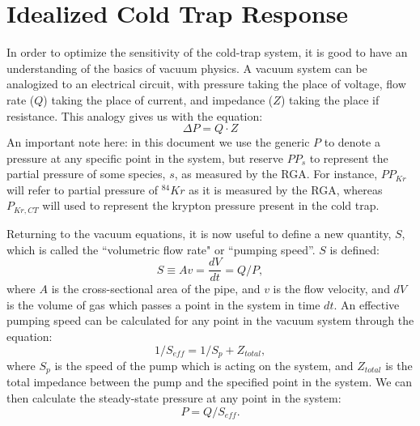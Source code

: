 \section{Idealized Cold Trap Response}
\label{sec:vaceq}
In order to optimize the sensitivity of the cold-trap system, it is good to have an understanding of the basics of vacuum physics. A vacuum system can be analogized to an electrical circuit, with pressure taking the place of voltage, flow rate ($Q$) taking the place of current, and impedance ($Z$) taking the place if resistance. This analogy gives us with the equation:
\begin{equation}
\label{eq:vaclaw1}
\Delta P = Q\cdot Z
\end{equation} 
An important note here: in this document we use the generic $P$ to denote a pressure at any specific point in the system, but reserve $PP_{s}$ to represent the partial pressure of some species, $s$, as measured by the RGA. For instance, $PP_{Kr}$ will refer to partial pressure of $^{84}Kr$ as it is measured by the RGA, whereas $P_{Kr,CT}$ will used to represent the krypton pressure present in the cold trap. 

Returning to the vacuum equations, it is now useful to define a new quantity, $S$, which is called the ``volumetric flow rate" or ``pumping speed''. $S$ is defined: 
\begin{equation}
\label{eq:volflow}
S \equiv Av = \frac{dV}{dt}=Q/P, 
\end{equation}
where $A$ is the cross-sectional area of the pipe, and $v$ is the flow velocity, and $dV$ is the volume of gas which passes a point in the system in time $dt$. An effective pumping speed can be calculated for any point in the vacuum system through the equation:
\begin{equation}
\label{ep:vacimp}
1/S_{eff} = 1/S_{p}+Z_{total}, 
\end{equation}
where $S_{p}$ is the speed of the pump which is acting on the system, and $Z_{total}$ is the total impedance between the pump and the specified point in the system. We can then calculate the steady-state pressure at any point in the system\cite{vac_eq}:
\begin{equation}
\label{eq:vaclaw2}
P=Q/S_{eff}.
\end{equation}


